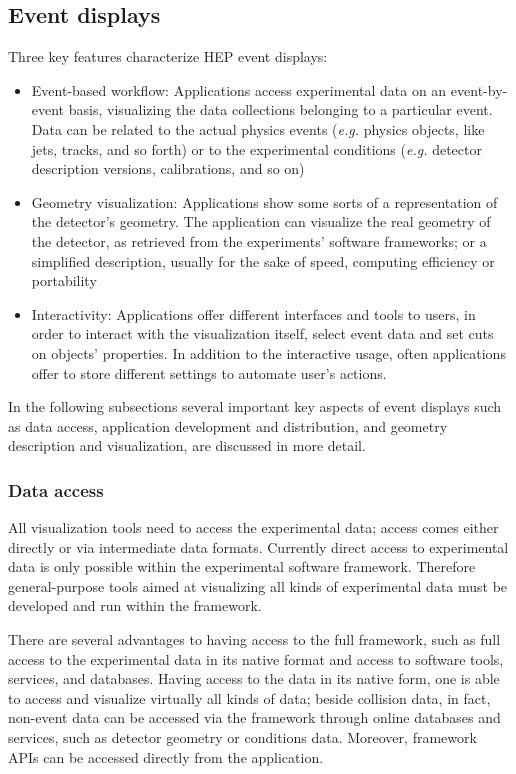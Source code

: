 \documentclass[12pt,a4paper]{article}
\begin{document}
\hypertarget{event-displays}{%
\subsection{Event displays}\label{event-displays}}

Three key features characterize HEP event displays:

\begin{itemize}
\item Event-based workflow: Applications access experimental data on an event-by-event basis,
visualizing the data collections belonging to a particular event. Data can be related to the
actual physics events ({\it e.g.} physics objects, like jets, tracks, and so forth) or to the experimental
conditions ({\it e.g.} detector description versions, calibrations, and so on)
\item Geometry visualization: Applications show some sorts of a representation of the detector’s geometry.
The application can visualize the real geometry of the detector, as retrieved from the experiments’ software
  frameworks; or a simplified description, usually for the sake of speed, computing efficiency or portability
\item Interactivity: Applications offer different interfaces and tools to users, in order to interact
with the visualization itself, select event data and set cuts on objects’ properties.
In addition to the interactive usage, often applications offer to store different settings to automate user’s actions.
\end{itemize}

In the following subsections several important key aspects of event displays such as data access, application development and distribution,
and geometry description and visualization, are discussed in more detail.


\hypertarget{data-access}{%
\subsubsection{Data access}\label{data-access}}

All visualization tools need to access the experimental data; access comes either directly or via intermediate data formats.
Currently direct access to experimental data is only possible within the experimental software framework. Therefore general-purpose
tools aimed at visualizing all kinds of experimental data must be developed and run within the framework.

There are several advantages to having access to the full framework, such as full access to the experimental data
in its native format and access to software tools, services, and databases. Having access to the data in its native form,
one is able to access and visualize virtually all kinds of data; beside collision data, in fact, non-event data can be
accessed via the framework through online databases and services, such as detector geometry or conditions data. Moreover,
framework APIs can be accessed directly from the application.
\end{document}
